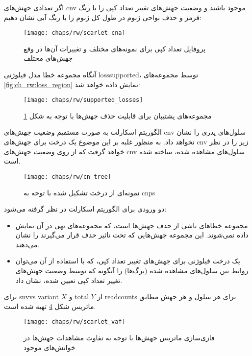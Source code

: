اگر تعدادی جهش‌های \gls{cnv} موجود باشند و  وضعیت جهش‌های تغییر تعداد کپی را با رنگ قرمز و حذف نواحی ژنوم در طول کل ژنوم را با رنگ آبی نشان دهیم:
\begin{figure}[!ht]
	\centerline{\texttt{[image: chaps/rw/scarlet\_cna]}}
	\caption{پروفایل تعداد کپی برای نمونه‌های مختلف و تغییرات آن‌ها در وقع جهش‌های مختلف}
	\label{fig:ch_rw:scarlet_cna}
\end{figure}
آنگاه مجموعه خطا مدل فیلوژنی \gls{losssupported}، توسط مجموعه‌های \ref{fig:ch_rw:loss_region} نمایش داده خواهد شد: 
\begin{figure}[!ht]
	\centerline{\texttt{[image: chaps/rw/supported\_losses]}}
	\caption{مجموعه‌های پشتیبان برای قابلیت حذف جهش‌ها با توجه به شکل \ref{fig:ch_rw:scarlet_cna}}
	\label{fig:ch_rw:supported_losses}
\end{figure}
الگوریتم اسکارلت به صورت مستقیم وضعیت جهش‌های \gls{cnv} سلول‌های پدری را نشان نخواهد داد. به منظور غلبه بر این موضوع یک درخت برای جهش‌های \gls{cnv} زیر را در نظر خواهد گرفت که از روی وضعیت جهش‌های \gls{cnv} سلو‌‌ل‌های مشاهده شده، ساخته شده است. 
\begin{figure}[!ht]
	\centerline{\texttt{[image: chaps/rw/cn\_tree]}}
	\caption{نمونه‌ای از درخت تشکیل شده با توجه به \glspl{cnp}}
	\label{fig:ch_rw:cn_tree}
\end{figure}
دو ورودی برای الگوریتم اسکارلت در نظر گرفته می‌شود: 
\begin{itemize}
	\item مجموعه خطاهای ناشی از حذف جهش‌ها است، که مجموعه‌های تهی در آن نمایش داده نمی‌شوند. این مجموعه جهش‌هایی که تحت تاثیر حذف قرار می‌گیرند را نشان می‌دهند. 
	\item یک درخت فیلوژنی برای جهش‌های تغییر تعداد کپی، که با استفاده از آن می‌توان روابط بین سلول‌های مشاهده شده (برگ‌ها) را آنگونه که توسط وضعیت جهش‌های تغییر تعداد کپی تعیین شده، نشان داد.
\end{itemize}
برای \glspl{snvv} \gls{variant}  $X$ و  \gls{total} $Y$  از  \gls{readcounts} برای هر سلول و هر جهش مطابق ماتریس شکل \ref{fig:ch_rw:scarlet_vaf} تهیه شده است.
\begin{figure}[!ht]
	\centerline{\texttt{[image: chaps/rw/scarlet\_vaf]}}
	\caption{فازی‌سازی ماتریس جهش‌ها با توجه به تفاوت مشاهدات جهش‌ها در خوانش‌های موجود}
	\label{fig:ch_rw:scarlet_vaf}
\end{figure}
